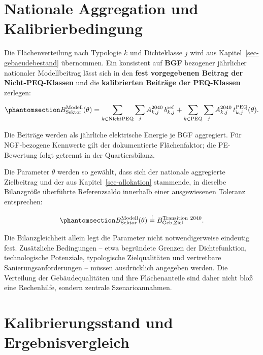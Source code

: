 \documentclass[
  ngerman,
  a4paper,
  DIV=11]{scrreprt}
\begin{document}
\section{Nationale Aggregation und
Kalibrierbedingung}\label{nationale-aggregation-und-kalibrierbedingung}

Die Flächenverteilung nach Typologie \(k\) und Dichteklasse \(j\) wird
aus Kapitel~\ref{sec-gebaeudebestand} übernommen. Ein konsistent auf
\textbf{BGF} bezogener jährlicher nationaler Modellbeitrag lässt sich in
den \textbf{fest vorgegebenen Beitrag der Nicht-PEQ-Klassen} und die
\textbf{kalibrierten Beiträge der PEQ-Klassen} zerlegen:

\begin{equation}\protect\phantomsection\label{eq-sektor-aggregation}{
B_{\mathrm{Sektor}}^{\mathrm{Modell}}(\theta)
=\sum_{k\in\mathrm{NichtPEQ}}\sum_j A_{k,j}^{2040}\,b_{k,j}^{\mathrm{ref}}
+\sum_{k\in\mathrm{PEQ}}\sum_j A_{k,j}^{2040}\,t_{k,j}^{\mathrm{PEQ}}(\theta).
}\end{equation}

Die Beiträge werden als jährliche elektrische Energie je BGF aggregiert.
Für NGF-bezogene Kennwerte gilt der dokumentierte Flächenfaktor; die
PE-Bewertung folgt getrennt in der Quartiersbilanz.

Die Parameter \(\theta\) werden so gewählt, dass sich der nationale
aggregierte Zielbeitrag und der aus Kapitel~\ref{sec-allokation}
stammende, in dieselbe Bilanzgröße überführte Referenzsaldo innerhalb
einer ausgewiesenen Toleranz entsprechen:

\begin{equation}\protect\phantomsection\label{eq-kalibrierziel}{
B_{\mathrm{Sektor}}^{\mathrm{Modell}}(\theta)
\stackrel{!}{=}B_{\mathrm{Geb,Ziel}}^{\mathrm{Transition\ 2040}}.
}\end{equation}

Die Bilanzgleichheit allein legt die Parameter nicht notwendigerweise
eindeutig fest. Zusätzliche Bedingungen -- etwa begründete Grenzen der
Dichtefunktion, technologische Potenziale, typologische Zielqualitäten
und vertretbare Sanierungsanforderungen -- müssen ausdrücklich angegeben
werden. Die Verteilung der Gebäudequalitäten und ihre Flächenanteile
sind daher nicht bloß eine Rechenhilfe, sondern zentrale
Szenarioannahmen.

\section{Kalibrierungsstand und
Ergebnisvergleich}\label{kalibrierungsstand-und-ergebnisvergleich}
\end{document}
